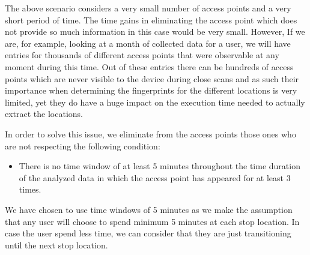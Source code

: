 The above scenario considers a very small number of access points and a very
short period of time. The time gains in eliminating the access point which does
not provide so much information in this case would be very small. However, If we
are, for example, looking at a month of collected data for a user, we will have
entries for thousands of different access points that were observable at any
moment during this time. Out of these entries there can be hundreds of access
points which are never visible to the device during close scans and as such
their importance when determining the fingerprints for the different locations
is very limited, yet they do have a huge impact on the execution time needed to
actually extract the locations.

In order to solve this issue, we eliminate from the access points those ones who
are not respecting the following condition:
\begin{itemize}
  \item There is no time window of at least 5 minutes throughout the time
  duration of the analyzed data in which the access point has appeared for at least 3
  times.
\end{itemize}

We have chosen to use time windows of 5 minutes as we make the assumption that
any user will choose to spend minimum 5 minutes at each stop location. In case
the user spend less time, we can consider that they are just transitioning until
the next stop location.
